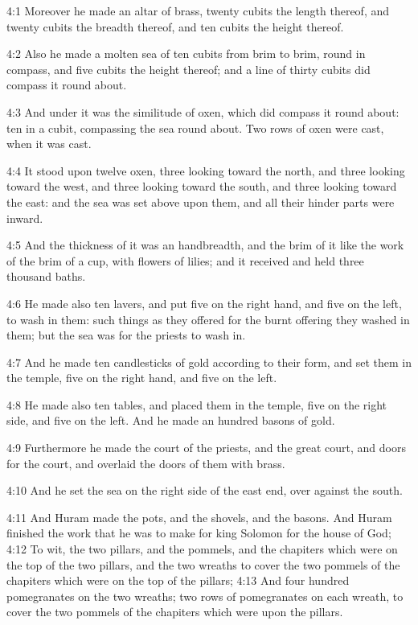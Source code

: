 4:1 Moreover he made an altar of brass, twenty cubits the length thereof, and twenty cubits the breadth thereof, and ten cubits the height thereof.

4:2 Also he made a molten sea of ten cubits from brim to brim, round in compass, and five cubits the height thereof; and a line of thirty cubits did compass it round about.

4:3 And under it was the similitude of oxen, which did compass it round about: ten in a cubit, compassing the sea round about. Two rows of oxen were cast, when it was cast.

4:4 It stood upon twelve oxen, three looking toward the north, and three looking toward the west, and three looking toward the south, and three looking toward the east: and the sea was set above upon them, and all their hinder parts were inward.

4:5 And the thickness of it was an handbreadth, and the brim of it like the work of the brim of a cup, with flowers of lilies; and it received and held three thousand baths.

4:6 He made also ten lavers, and put five on the right hand, and five on the left, to wash in them: such things as they offered for the burnt offering they washed in them; but the sea was for the priests to wash in.

4:7 And he made ten candlesticks of gold according to their form, and set them in the temple, five on the right hand, and five on the left.

4:8 He made also ten tables, and placed them in the temple, five on the right side, and five on the left. And he made an hundred basons of gold.

4:9 Furthermore he made the court of the priests, and the great court, and doors for the court, and overlaid the doors of them with brass.

4:10 And he set the sea on the right side of the east end, over against the south.

4:11 And Huram made the pots, and the shovels, and the basons. And Huram finished the work that he was to make for king Solomon for the house of God; 4:12 To wit, the two pillars, and the pommels, and the chapiters which were on the top of the two pillars, and the two wreaths to cover the two pommels of the chapiters which were on the top of the pillars; 4:13 And four hundred pomegranates on the two wreaths; two rows of pomegranates on each wreath, to cover the two pommels of the chapiters which were upon the pillars.

